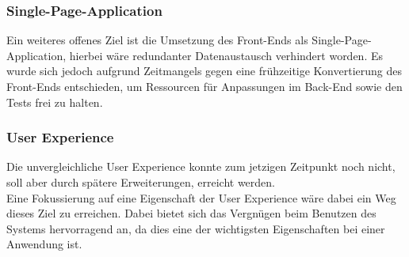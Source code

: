 \subsubsection*{Single-Page-Application}
Ein weiteres offenes Ziel ist die Umsetzung des Front-Ends als Single-Page-Application, hierbei wäre redundanter Datenaustausch verhindert worden.
Es wurde sich jedoch aufgrund Zeitmangels gegen eine frühzeitige Konvertierung des Front-Ends entschieden, um Ressourcen für Anpassungen im Back-End sowie den Tests frei zu halten. 

\subsubsection*{User Experience}
Die unvergleichliche User Experience konnte zum jetzigen Zeitpunkt noch nicht, soll aber durch spätere Erweiterungen, erreicht werden. \\
Eine Fokussierung auf eine Eigenschaft der User Experience wäre dabei ein Weg dieses Ziel zu erreichen.
Dabei bietet sich das Vergnügen beim Benutzen des Systems hervorragend an, da dies eine der wichtigsten Eigenschaften bei einer Anwendung ist.
